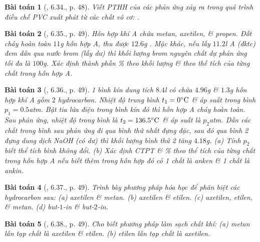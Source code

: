 \documentclass{article}
\newtheorem{baitoan}{Bài toán}
\begin{document}
\begin{baitoan}[\cite{SBT_Hoa_Hoc_11_co_ban}, 6.34., p. 48]
	Viết PTHH của các phản ứng xảy ra trong quá trình điều chế PVC xuất phát từ các chất vô cơ: \emph{}.
\end{baitoan}

\begin{baitoan}[\cite{SBT_Hoa_Hoc_11_co_ban}, 6.35., p. 49]
	Hỗn hợp khí A chứa metan, axetilen, \& propen. Đốt cháy hoàn toàn $11$\emph{g} hỗn hợp A, thu được $12.6$\emph{g }. Mặc khác, nếu lấy $11.2$\emph{l} A (đktc) đem dẫn qua nước brom (lấy dư) thì khối lượng brom nguyên chất dự phản ứng tối đa là $100$\emph{g}. Xác định thành phần \% theo khối lượng \& theo thế tích của từng chất trong hỗn hợp A.
\end{baitoan}

\begin{baitoan}[\cite{SBT_Hoa_Hoc_11_co_ban}, 6.36., p. 49]
	1 bình kín dung tích $8.4$\emph{l} có chứa $4.96$\emph{g } \& $1.3$\emph{g} hỗn hợp khí A gồm $2$ hydrocarbon. Nhiệt độ trung bình $t_1 = 0^\circ{\rm C}$ \& áp suất trong bình $p_1 = 0.5$\emph{atm}. Bật tia lửa điện trong bình kín đó thì hỗn hợp A cháy hoàn toàn. Sau phản ứng, nhiệt độ trong bình là $t_2 = 136.5^\circ{\rm C}$ \& áp suất là $p_2$\emph{atm}. Dẫn các chất trong bình sau phản ứng đi qua bình thứ nhất đựng \emph{} đặc, sau đó qua bình 2 đựng dung dịch \emph{NaOH} (có dư) thì khối lượng bình thứ 2 tăng $4.18$\emph{g}. (a) Tính $p_2$ biết thể tích bình không đổi. (b) Xác định CTPT \& \% theo thể tích của từng chất trong hỗn hợp A nếu biết thêm trong hỗn hợp đó có 1 chất là anken \& 1 chất là ankin.
\end{baitoan}

\begin{baitoan}[\cite{SBT_Hoa_Hoc_11_co_ban}, 6.37., p. 49]
	Trình bày phương pháp hóa học để phân biệt các hydrocarbon sau: (a) axetilen \& metan. (b) axetilen \& etilen. (c) axetilen, etilen, \& metan. (d) but-$1$-in \& but-$2$-in.
\end{baitoan}

\begin{baitoan}[\cite{SBT_Hoa_Hoc_11_co_ban}, 6.38., p. 49]
	Cho biết phương pháp làm sạch chất khí: (a) metan lẫn tạp chất là axetilen \& etilen. (b) etilen lẫn tạp chất là axetilen.
\end{baitoan}

\end{document}
